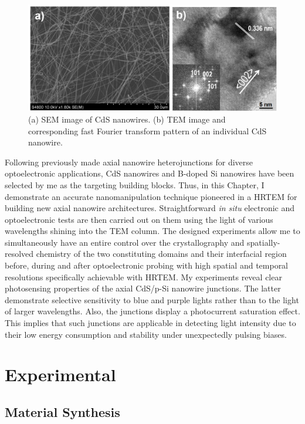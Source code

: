 \begin{figure}  
\includegraphics[width=\textwidth]{figures/figure3_s1}
\caption[SEM and TEM of CdS nanowires.]{(a) SEM image of CdS nanowires. (b) TEM image and corresponding fast Fourier
transform pattern of an individual CdS nanowire. 
\label{fig:fig3_s1}}
\end{figure}

Following previously made axial nanowire heterojunctions for diverse optoelectronic applications, CdS nanowires and B-doped Si nanowires have been selected by me as the targeting building blocks. Thus, in this Chapter, I demonstrate an accurate nanomanipulation technique pioneered in a HRTEM for building new axial nanowire architectures. Straightforward \emph{in situ} electronic and optoelectronic tests are then carried out on them using the light of various wavelengths shining into the TEM column. The designed experiments allow me to simultaneously have an entire control over the crystallography and spatially-resolved chemistry of the two constituting domains and their interfacial region before, during and after optoelectronic probing with high spatial and temporal resolutions specifically achievable with HRTEM. 
My experiments reveal clear photosensing properties of the axial CdS/p-Si nanowire junctions. The latter demonstrate selective sensitivity to blue and purple lights rather than to the light of larger wavelengths. Also, the junctions display a photocurrent saturation effect. This implies that such junctions are applicable in detecting light intensity due to their low energy consumption and stability under unexpectedly pulsing biases. 

\section{Experimental}
\subsection{Material Synthesis}

